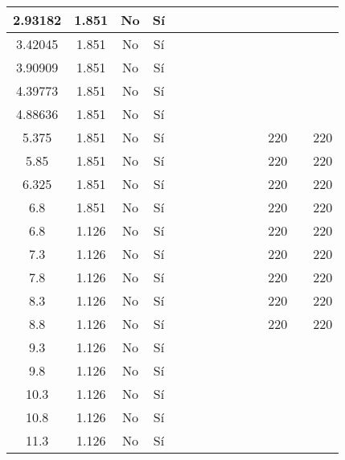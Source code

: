 \begin{table}[H]
{\begin{tabular}{|c|c|c|c|c|c|c|c|c|c|c|c|c|c|}
\hline
2.93182 & 1.851 & No  & Sí  &     &     &     &     &     &     &     &     &     &  \bigstrut\\
\hline
3.42045 & 1.851 & No  & Sí  &     &     &     &     &     &     &     &     &     &  \bigstrut\\
\hline
3.90909 & 1.851 & No  & Sí  &     &     &     &     &     &     &     &     &     &  \bigstrut\\
\hline
4.39773 & 1.851 & No  & Sí  &     &     &     &     &     &     &     &     &     &  \bigstrut\\
\hline
4.88636 & 1.851 & No  & Sí  &     &     &     &     &     &     &     &     &     &  \bigstrut\\
\hline
5.375 & 1.851 & No  & Sí  &     &     &     &     &     &     &     & 220 &     & 220 \bigstrut\\
\hline
5.85 & 1.851 & No  & Sí  &     &     &     &     &     &     &     & 220 &     & 220 \bigstrut\\
\hline
6.325 & 1.851 & No  & Sí  &     &     &     &     &     &     &     & 220 &     & 220 \bigstrut\\
\hline
6.8 & 1.851 & No  & Sí  &     &     &     &     &     &     &     & 220 &     & 220 \bigstrut\\
\hline
6.8 & 1.126 & No  & Sí  &     &     &     &     &     &     &     & 220 &     & 220 \bigstrut\\
\hline
7.3 & 1.126 & No  & Sí  &     &     &     &     &     &     &     & 220 &     & 220 \bigstrut\\
\hline
7.8 & 1.126 & No  & Sí  &     &     &     &     &     &     &     & 220 &     & 220 \bigstrut\\
\hline
8.3 & 1.126 & No  & Sí  &     &     &     &     &     &     &     & 220 &     & 220 \bigstrut\\
\hline
8.8 & 1.126 & No  & Sí  &     &     &     &     &     &     &     & 220 &     & 220 \bigstrut\\
\hline
9.3 & 1.126 & No  & Sí  &     &     &     &     &     &     &     &     &     &  \bigstrut\\
\hline
9.8 & 1.126 & No  & Sí  &     &     &     &     &     &     &     &     &     &  \bigstrut\\
\hline
10.3 & 1.126 & No  & Sí  &     &     &     &     &     &     &     &     &     &  \bigstrut\\
\hline
10.8 & 1.126 & No  & Sí  &     &     &     &     &     &     &     &     &     &  \bigstrut\\
\hline
11.3 & 1.126 & No  & Sí  &     &     &     &     &     &     &     &     &     &  \bigstrut\\

\end{tabular}}
\end{table}
